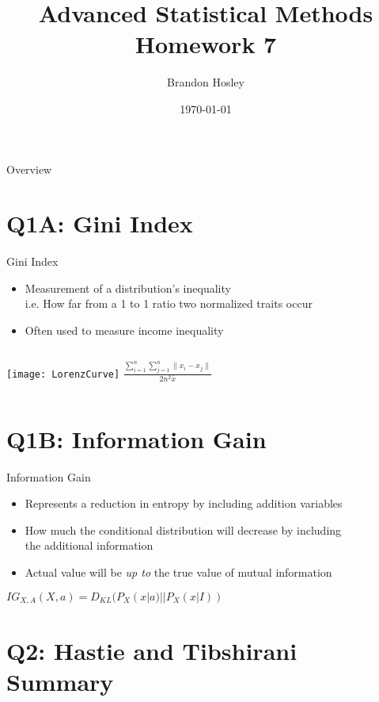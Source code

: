 \documentclass{beamer}
\title{Advanced Statistical Methods \\ Homework 7}
\author{Brandon Hosley}
\institute{University of Illinois - Springfield}
\date{\today}
\begin{document}
\frame{\titlepage}

\begin{frame}{Overview}
\tableofcontents
\end{frame}

\section[Q1A]{Q1A: Gini Index}
\begin{frame}{Gini Index}
	\begin{itemize}
		\item Measurement of a distribution's inequality \\
		i.e. How far from a 1 to 1 ratio two normalized traits occur
		\item Often used to measure income inequality
	\end{itemize}
	\begin{columns}
			\texttt{[image: LorenzCurve]}
			\centering
			$ \frac{ \sum_{i=1}^{n} \sum_{j=1}^{n} \| x_i - x_j \| }{ 2n^2 \bar{x} } $
	\end{columns}
\end{frame}

\section[Q1B]{Q1B: Information Gain}
\begin{frame}{Information Gain}
	\begin{itemize}
		\item Represents a reduction in entropy by including addition variables
		\item How much the conditional distribution will decrease by including \\
			the additional information
		\item Actual value will be \emph{up to} the true value of mutual information
	\end{itemize}
	\vspace{1.5em}
	\centering
	$ IG_{X,A}(X,a) = D_{KL}(P_X(x|a)||P_X(x|I)) $
\end{frame}

\section[Q2]{Q2: Hastie and Tibshirani Summary}
\end{document}
